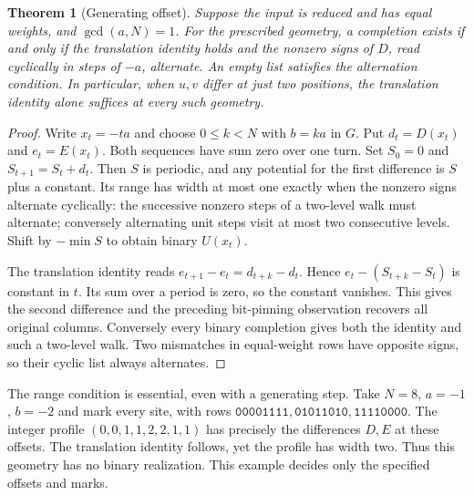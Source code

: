 \documentclass[11pt]{article}
\newtheorem{theorem}{Theorem}[section]
\newcommand{\w}[1]{\texttt{#1}}
\begin{document}
\begin{theorem}[Generating offset]\label{gen}
Suppose the input is reduced and has equal weights, and $\gcd(a,N)=1$. For the prescribed geometry, a completion exists if and only if the translation identity holds and the nonzero signs of $D$, read cyclically in steps of $-a$, alternate. An empty list satisfies the alternation condition. In particular, when $u,v$ differ at just two positions, the translation identity alone suffices at every such geometry.
\end{theorem}
\begin{proof}
Write $x_t=-ta$ and choose $0\le k<N$ with $b=ka$ in $G$. Put $d_t=D(x_t)$ and $e_t=E(x_t)$. Both sequences have sum zero over one turn. Set $S_0=0$ and $S_{t+1}=S_t+d_t$. Then $S$ is periodic, and any potential for the first difference is $S$ plus a constant. Its range has width at most one exactly when the nonzero signs alternate cyclically: the successive nonzero steps of a two-level walk must alternate; conversely alternating unit steps visit at most two consecutive levels. Shift by $-\min S$ to obtain binary $U(x_t)$.

The translation identity reads $e_{t+1}-e_t=d_{t+k}-d_t$. Hence
$e_t-(S_{t+k}-S_t)$ is constant in $t$. Its sum over a period is zero, so the constant vanishes. This gives the second difference and the preceding bit-pinning observation recovers all original columns. Conversely every binary completion gives both the identity and such a two-level walk. Two mismatches in equal-weight rows have opposite signs, so their cyclic list always alternates.
\end{proof}

The range condition is essential, even with a generating step. Take $N=8$, $a=-1$, $b=-2$ and mark every site, with rows $\w{00001111},\w{01011010},\w{11110000}$. The integer profile $(0,0,1,1,2,2,1,1)$ has precisely the differences $D,E$ at these offsets. The translation identity follows, yet the profile has width two. Thus this geometry has no binary realization. This example decides only the specified offsets and marks.
\end{document}
